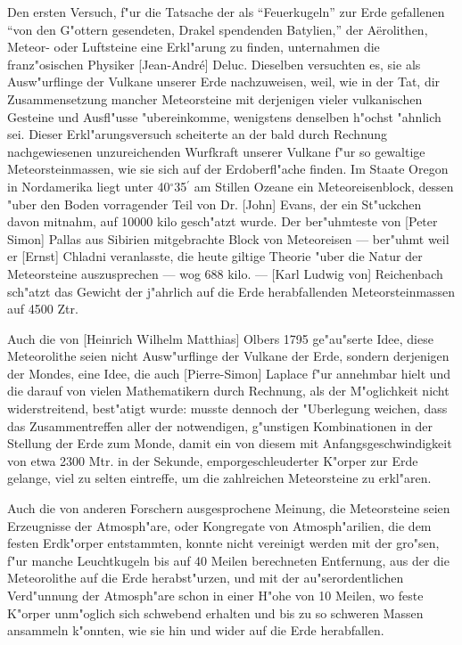 \documentclass[a4paper, 11pt, oneside]{article}
\begin{document}
Den ersten Versuch, f"ur die Tatsache der als "`Feuerkugeln"' zur Erde gefallenen "`von den G"ottern gesendeten, Drakel spendenden Batylien,"' der Aërolithen, Meteor- oder Luftsteine eine Erkl"arung zu finden, unternahmen die franz"osischen Physiker [Jean-André] Deluc. Dieselben versuchten es, sie als Ausw"urflinge der Vulkane unserer Erde nachzuweisen, weil, wie in der Tat, dir Zusammensetzung mancher Meteorsteine mit derjenigen vieler vulkanischen Gesteine und Ausfl"usse "ubereinkomme, wenigstens denselben h"ochst "ahnlich sei. Dieser Erkl"arungsversuch scheiterte an der bald durch Rechnung nachgewiesenen unzureichenden Wurfkraft unserer Vulkane f"ur so gewaltige Meteorsteinmassen, wie sie sich auf der Erdoberfl"ache finden. Im Staate Oregon in Nordamerika liegt unter 40$^{\circ}$35$^{\prime}$ am Stillen Ozeane ein Meteoreisenblock, dessen "uber den Boden vorragender Teil von Dr. [John] Evans, der ein St"uckchen davon mitnahm, auf 10000 kilo gesch"atzt wurde. Der ber"uhmteste von [Peter Simon] Pallas aus Sibirien mitgebrachte Block von Meteoreisen --- ber"uhmt weil er [Ernst] Chladni veranlasste, die heute giltige Theorie "uber die Natur der Meteorsteine auszusprechen --- wog 688 kilo. --- [Karl Ludwig von] Reichenbach sch"atzt das Gewicht der j"ahrlich auf die Erde herabfallenden Meteorsteinmassen auf 4500 Ztr.

Auch die von [Heinrich Wilhelm Matthias] Olbers 1795 ge"au"serte Idee, diese Meteorolithe seien nicht Ausw"urflinge der Vulkane der Erde, sondern derjenigen der Mondes, eine Idee, die auch [Pierre-Simon] Laplace f"ur annehmbar hielt und die darauf von vielen Mathematikern durch Rechnung, als der M"oglichkeit nicht widerstreitend, best"atigt wurde: musste dennoch der "Uberlegung weichen, dass das Zusammentreffen aller der notwendigen, g"unstigen Kombinationen in der Stellung der Erde zum Monde, damit ein von diesem mit Anfangsgeschwindigkeit von etwa 2300 Mtr. in der Sekunde, emporgeschleuderter K"orper zur Erde gelange, viel zu selten eintreffe, um die zahlreichen Meteorsteine zu erkl"aren.

Auch die von anderen Forschern ausgesprochene Meinung, die Meteorsteine seien Erzeugnisse der Atmosph"are, oder Kongregate von Atmosph"arilien, die dem festen Erdk"orper entstammten, konnte nicht vereinigt werden mit der gro"sen, f"ur manche Leuchtkugeln bis auf 40 Meilen berechneten Entfernung, aus der die Meteorolithe auf die Erde herabst"urzen, und mit der au"serordentlichen Verd"unnung der Atmosph"are schon in einer H"ohe von 10 Meilen, wo feste K"orper unm"oglich sich schwebend erhalten und bis zu so schweren Massen ansammeln k"onnten, wie sie hin und wider auf die Erde herabfallen.
\end{document}
